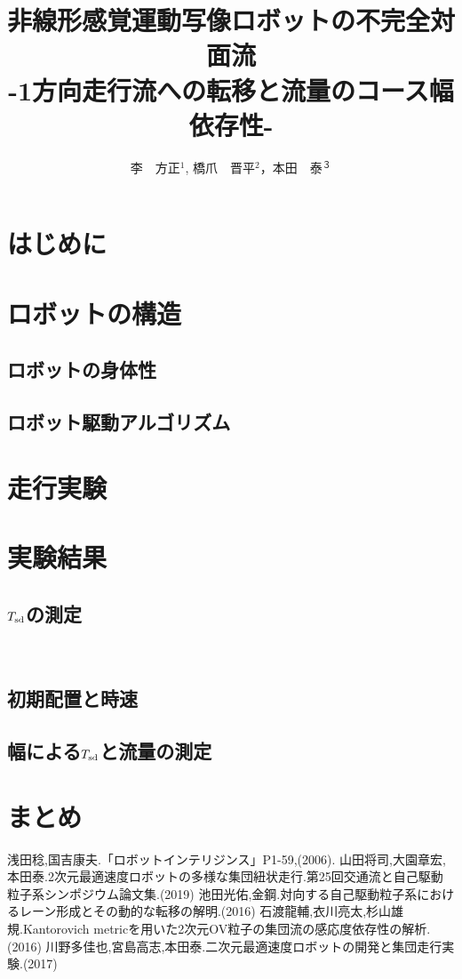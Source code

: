 \documentclass[twocolumn]{jarticle} %
\title{%
非線形感覚運動写像ロボットの不完全対面流\\
{\Large -1方向走行流への転移と流量のコース幅依存性-}
}
\author{%
李　方正$^1$, 橋爪　晋平$^2$，本田　泰$^３$
}
\affiliation{%
$^1$ 室蘭工業大学大学院　工学研究科　情報電子工学系専攻\\
$^2$ 室蘭工業大学　工学部　情報電子工学系学科\\
$^3$ 室蘭工業大学大学院　しくみ解明系領域
}
\begin{document}
\maketitle

\section{はじめに}
   
\section{ロボットの構造}
\subsection{ロボットの身体性}
   
\subsection{ロボット駆動アルゴリズム}
   
\section{走行実験}
   
\section{実験結果}
\subsection{$T_{\rm sd}$の測定}
　　
\subsection{初期配置と時速}
   
\subsection{幅による$T_{\rm sd}$と流量の測定}
   
\section{まとめ}
   

\begin{thebibliography}{99}
 浅田稔,国吉康夫.「ロボットインテリジンス」P1-59,(2006).
 山田将司,大園章宏,本田泰.2次元最適速度ロボットの多様な集団紐状走行.第25回交通流と自己駆動粒子系シンポジウム論文集.(2019)
 池田光佑,金鋼.対向する自己駆動粒子系におけるレーン形成とその動的な転移の解明.(2016)
 石渡龍輔,衣川亮太,杉山雄規.Kantorovich metricを用いた2次元OV粒子の集団流の感応度依存性の解析.(2016)
 川野多佳也,宮島高志,本田泰.二次元最適速度ロボットの開発と集団走行実験.(2017)
\end{thebibliography}
\end{document}
